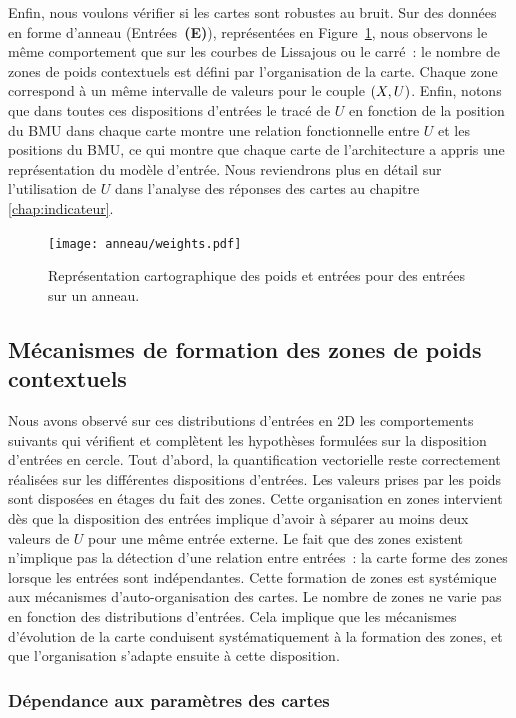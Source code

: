 \documentclass[../main]{subfiles}
\begin{document}
Enfin, nous voulons vérifier si les cartes sont robustes au bruit. 
Sur des données en forme d'anneau (Entrées~\textbf{(E)}), représentées en Figure~\ref{fig:anneau_w}, nous observons le même comportement que sur les courbes de Lissajous ou le carré~: le nombre de zones de poids contextuels est défini par l'organisation de la carte. Chaque zone correspond à un même intervalle de valeurs pour le couple $(X, U)$.
Enfin, notons que dans toutes ces dispositions d'entrées le tracé de $U$ en fonction de la position du BMU dans chaque carte montre une relation fonctionnelle entre $U$ et les positions du BMU, ce qui montre que chaque carte de l'architecture a appris une représentation du modèle d'entrée. Nous reviendrons plus en détail sur l'utilisation de $U$ dans l'analyse des réponses des cartes au chapitre \ref{chap:indicateur}.


\begin{figure}[h!]
	\centering\texttt{[image: anneau/weights.pdf]}
	\caption{Représentation cartographique des poids et entrées pour des entrées sur un anneau. \label{fig:anneau_w}}
\end{figure}

\subsection{Mécanismes de formation des zones de poids contextuels}

Nous avons observé sur ces distributions d'entrées en 2D les comportements suivants qui vérifient et complètent les hypothèses formulées sur la disposition d'entrées en cercle.
Tout d'abord, la quantification vectorielle reste correctement réalisées sur les différentes dispositions d'entrées. 
Les valeurs prises par les poids sont disposées en étages du fait des zones.
Cette organisation en zones intervient dès que la disposition des entrées implique d'avoir à séparer au moins deux valeurs de $U$ pour une même entrée externe.
Le fait que des zones existent n'implique pas la détection d'une relation entre entrées~: la carte forme des zones lorsque les entrées sont indépendantes. Cette formation de zones est systémique aux mécanismes d'auto-organisation des cartes. Le nombre de zones ne varie pas en fonction des distributions d'entrées. Cela implique que les mécanismes d'évolution de la carte conduisent systématiquement à la formation des zones, et que l'organisation s'adapte ensuite à cette disposition. 

\subsubsection{Dépendance aux paramètres des cartes}
\end{document}
